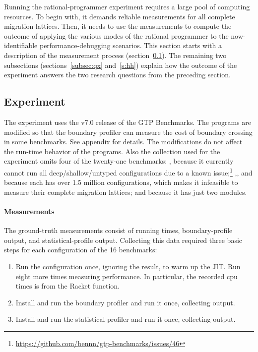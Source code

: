 \newcommand{\numgtp}{16}
\newcommand{\boundaryMB}{536} %
\newcommand{\statisticalMB}{4645} %
\newcommand{\runtimeMB}{44}

Running the rational-programmer experiment requires a large pool of computing
resources.  To begin with, it demands reliable measurements for all complete
migration lattices. Then, it needs to use the measurements to compute the
outcome of applying the various modes of the rational programmer to the
now-identifiable performance-debugging scenarios. This section starts with a
description of the measurement process (section~\ref{subsec:experiment}). The
remaining two subsections (sections~\ref{subsec:qx} and~\ref{s:hh}) explain how
the outcome of the experiment answers the two research questions from the
preceding section.

\subsection{Experiment} \label{subsec:experiment} \label{sec:data}

The experiment uses the v7.0 release of the GTP Benchmarks. The programs are
modified so that the boundary profiler can measure the cost of boundary crossing
in some benchmarks. See appendix for details.  The
modifications do not affect the run-time behavior of the programs.  Also the
collection used for the experiment omits four of the twenty-one benchmarks:
, because it currently cannot run all deep/shallow/untyped
configurations due to a known issue;\footnote{
\url{https://github.com/bennn/gtp-benchmarks/issues/46}}
,, and  because each has over 1.5
million configurations, which makes it infeasible to measure their complete
migration lattices; and  because it has just two modules.

\paragraph{Measurements} 

The ground-truth measurements consist of running times, boundary-profile output,
and statistical-profile output.  Collecting this data required three basic steps
for each configuration of the \numgtp{} benchmarks:
\begin{enumerate}

\item Run the configuration once, ignoring the result, to warm up the JIT.  Run
    eight more times measuring performance.  In particular, the recorded {cpu
    time}s is from the Racket  function.

\item Install and run the boundary profiler and run it once, collecting output.

\item Install and run the statistical profiler and run it once, collecting
output.

\end{enumerate}


